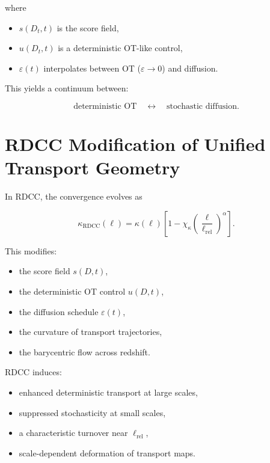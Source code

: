 \documentclass[11pt,a4paper]{article}
\begin{document}
where

\begin{itemize}
    \item $s(D_{t}, t)$ is the score field,
    \item $u(D_{t}, t)$ is a deterministic OT-like control,
    \item $\varepsilon(t)$ interpolates between OT ($\varepsilon \to 0$) and diffusion.
\end{itemize}

This yields a continuum between:



\[
\text{deterministic OT} \quad \leftrightarrow \quad \text{stochastic diffusion}.
\]


\section{RDCC Modification of Unified Transport Geometry}

In RDCC, the convergence evolves as

\begin{equation}
    \kappa_{\mathrm{RDCC}}(\ell)
    = \kappa(\ell)
      \left[
        1 - \chi_{\kappa}
        \left(\frac{\ell}{\ell_{\mathrm{rel}}}\right)^{\alpha}
      \right].
\end{equation}

This modifies:

\begin{itemize}
    \item the score field $s(D,t)$,
    \item the deterministic OT control $u(D,t)$,
    \item the diffusion schedule $\varepsilon(t)$,
    \item the curvature of transport trajectories,
    \item the barycentric flow across redshift.
\end{itemize}

RDCC induces:

\begin{itemize}
    \item enhanced deterministic transport at large scales,
    \item suppressed stochasticity at small scales,
    \item a characteristic turnover near $\ell_{\mathrm{rel}}$,
    \item scale-dependent deformation of transport maps.
\end{itemize}
\end{document}
